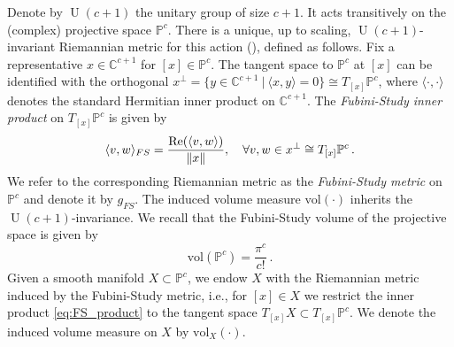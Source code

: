 \documentclass{article}
\theoremstyle{definition}
\DeclareMathOperator{\U}{U}
\newcommand{\C}{\mathbb{C}}
\newcommand{\vol}{\mathrm{vol}}
\renewcommand{\P}{\mathbb{P}}
\begin{document}
Denote by $\U(c+1)$ the unitary group of size $c+1$. It acts transitively on the (complex) projective space $\P^{c}$. There is a unique, up to scaling, $\U(c+1)$-invariant Riemannian metric for this action (\cite{Cartan_1952}), defined as follows. Fix a representative $x \in \C^{c+1}$ for $[x] \in \P^c$. The tangent space to $\P^c$ at $[x]$ can be identified with the orthogonal $x^{\perp}=\{y \in \C^{c+1} \ | \ \langle x,y \rangle =0\} \cong T_{[x]}\P^c$, where $\langle\cdot ,\cdot \rangle$ denotes the standard Hermitian inner product on $\C^{c+1}$. The \emph{Fubini-Study inner product} on $T_{[x]}\P^c$ is given by 
\begin{equation}\label{eq:FS_product}
    \langle v,w\rangle_{FS} = \frac{{\rm Re}(\langle v,w\rangle)}{\|x\|}, \quad \forall v,w \in x^{\perp}\cong T_{[x]}\P^c \, .
\end{equation}
We refer to the corresponding Riemannian metric as the \emph{Fubini-Study metric} on $\P^c$ and denote it by $g_{FS}$. The induced volume measure $\vol(\cdot)$ inherits the $\U(c+1)$-invariance. We recall that the Fubini-Study volume of the projective space is given by 
\begin{equation}\label{eq:proj_volume}
    \vol(\P^c)=\frac{\pi^c}{c!}\, . 
\end{equation}
Given a smooth manifold $X \subset \P^c$, we endow $X$ with the Riemannian metric induced by the Fubini-Study metric, i.e., for $[x]\in X$ we restrict the inner product \eqref{eq:FS_product} to the tangent space $T_{[x]}X \subset T_{[x]}\P^c$. We denote the induced volume measure on $X$ by $\vol_X(\cdot)$. \\
\end{document}
